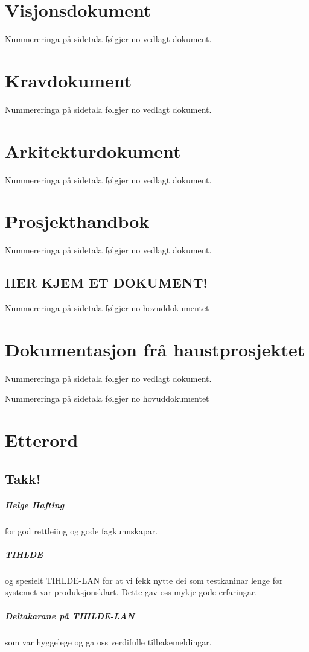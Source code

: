\documentclass[nynorsk,12pt,a4paper,oneside]{book}
\begin{document}
\chapter{Visjonsdokument}
	Nummereringa på sidetala følgjer no vedlagt dokument.
	
	
\chapter{Kravdokument}
	Nummereringa på sidetala følgjer no vedlagt dokument.
	
\chapter{Arkitekturdokument}
	Nummereringa på sidetala følgjer no vedlagt dokument.
  	
\chapter{Prosjekthandbok}
	Nummereringa på sidetala følgjer no vedlagt dokument.
%	
	\section*{HER KJEM ET DOKUMENT!}
	Nummereringa på sidetala følgjer no hovuddokumentet
\chapter{Dokumentasjon frå haustprosjektet}
		Nummereringa på sidetala følgjer no vedlagt dokument.
	
	Nummereringa på sidetala følgjer no hovuddokumentet

\backmatter
\chapter{Etterord}
\section{Takk!}
\paragraph{Helge Hafting} for god rettleiing og gode fagkunnskapar.
\paragraph{TIHLDE} og spesielt TIHLDE-LAN for at vi fekk nytte dei som testkaninar lenge før systemet var produksjonsklart. Dette gav oss mykje gode erfaringar.
\paragraph{Deltakarane på TIHLDE-LAN} som var hyggelege og ga oss verdifulle tilbakemeldingar.
\end{document}
